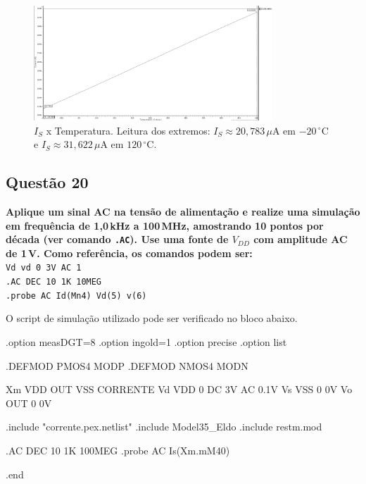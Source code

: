 \documentclass[12pt,a4paper]{article}
\newcommand{\degree}{\ensuremath{{}^\circ}}
\begin{document}
\begin{figure}[H]
    \centering
    \includegraphics[width=0.8\textwidth]{images/18.png}
    \caption{$I_S$ x Temperatura. Leitura dos extremos: $I_S\approx 20{,}783\,\mu$A em $-20\,\degree$C e $I_S\approx 31{,}622\,\mu$A em $120\,\degree$C.}
    \label{fig:q18_is_temp}
\end{figure}


\subsection*{Questão 20}
\begin{BoxQ}
    	\textbf{Aplique um sinal AC na tensão de alimentação e realize uma simulação em frequência de 1{,}0\,kHz a 100\,MHz, amostrando 10 pontos por década (ver comando \texttt{.AC}). Use uma fonte de $V_{DD}$ com amplitude AC de 1\,V. Como referência, os comandos podem ser:}\\
    	\texttt{Vd vd 0 3V AC 1}\\
    	\texttt{.AC DEC 10 1K 10MEG}\\
    	\texttt{.probe AC Id(Mn4) Vd(5) v(6)}
\end{BoxQ}

O script de simulação utilizado pode ser verificado no bloco abaixo.

\begin{codeblock}[title={Script de simulação (Questão 20)}]
.option measDGT=8
.option ingold=1
.option precise
.option list

.DEFMOD PMOS4 MODP
.DEFMOD NMOS4 MODN

Xm VDD OUT VSS CORRENTE
Vd VDD 0 DC 3V AC 0.1V
Vs VSS 0 0V
Vo OUT 0 0V

.include "corrente.pex.netlist"
.include Model35_Eldo
.include restm.mod

.AC DEC 10 1K 100MEG
.probe AC Is(Xm.mM40)

.end
\end{codeblock}
\end{document}
